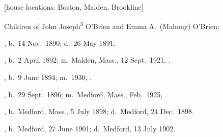[house locations: Boston, Malden, Brookline]

\begin{KidsIntro}
	Children of John Joseph\textsuperscript{3} O'Brien and Emma A.\ (Mahony) O'Brien:
\end{KidsIntro}

\begin{Kids}
	, b.\ 14 Nov.\ 1890;\cite{Mildred4OBrienBirth} d.\ 26 May 1891.\cite{Mildred4OBrienDeath}
	
	, b.\ 2 April 1892; m. Malden, Mass., 12 Sept.\ 1921, .
	
	, b.\ 9 June 1894; m.\ 1930, .
		
	, b.\ 29 Sept.\ 1896; m.\ Medford, Mass., Feb.\ 1925, .
	
	, b.\ Medford, Mass., 5 July 1898;\cite{Edward4OBrienBirth} d.\ Medford, 24 Dec.\ 1898.\cite{Edward4OBrienDeath}
	
	, b.\ Medford, 27 June 1901;\cite{Almyra4OBrienBirth} d.\ Medford, 13 July 1902.\cite{Almyra4OBrienDeath}
\end{Kids}
